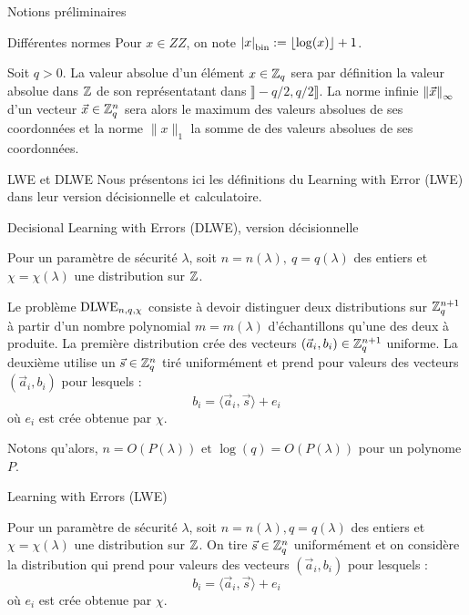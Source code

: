 \begin{section}{Notions préliminaires}
	\begin{subsection}{Différentes normes}
Pour $x\in ZZ$, on note ${|x|}_{\text{bin}} := \lfloor \log(x) \rfloor + 1$.

Soit $q > 0$. La valeur absolue d'un élément $x \in \mathbb{Z}_q$
sera par définition la valeur absolue dans $\mathbb{Z}$ de son représentatant dans
$\rrbracket - q/2, q/2 \rrbracket$. 
	La norme infinie ${\|\vec{x}\|}_{\infty}$ d'un vecteur $\vec{x} \in \mathbb{Z}_q^n$ sera 
alors le maximum des valeurs absolues de ses coordonnées et la norme
$\|x\|_{1}$ la somme de des valeurs absolues de ses coordonnées.

	\end{subsection}
	\begin{subsection}{LWE et DLWE}
	Nous présentons ici les définitions du Learning with Error (LWE) dans leur version décisionnelle et calculatoire.
	
	\begin{definition}{Decisional Learning with Errors (DLWE), version décisionnelle}

	Pour un paramètre de sécurité $\lambda$, soit $n = n(\lambda),\ q = q(\lambda)$ des entiers et $\chi =
	\chi(\lambda)$ une distribution sur $\mathbb{Z}$.
	
	Le problème $\text{DLWE}_{n,q,\chi}$ consiste à devoir distinguer deux distributions sur $\mathbb{Z}_q^{n+1}$ à partir d'un nombre
	polynomial $m = m(\lambda)$ d'échantillons qu'une des deux à produite. La première distribution crée des
	vecteurs $(\vec{a}_i,b_i) \in \mathbb{Z}_q^{n+1}$ uniforme. La deuxième utilise un $\vec{s} \in \mathbb{Z}_q^n$ tiré
	uniformément et prend pour valeurs des vecteurs $(\vec{a}_i, b_i)$ pour lesquels : \[ b_i = \langle \vec{a}_i,
	\vec{s} \rangle + e_i \] où $e_i$ est crée obtenue par $\chi$. \\ \end{definition}
	Notons qu'alors, $n = O(P(\lambda))\text{ et }\log(q) = O(P(\lambda))$ pour un polynome $P$.

	\begin{definition}{Learning with Errors (LWE)}
	
	Pour un paramètre de sécurité $\lambda$, soit $n = n(\lambda),q = q(\lambda)$ des entiers et $\chi =
	\chi(\lambda)$ une distribution sur $\mathbb{Z}$. On tire $\vec{s} \in \mathbb{Z}_q^n$ uniformément et on considère la
	distribution qui prend pour valeurs des vecteurs $(\vec{a}_i, b_i)$ pour lesquels :
	\[ b_i = \langle \vec{a}_i, \vec{s} \rangle + e_i \]
	où $e_i$ est crée obtenue par $\chi$.


\end{definition}
\end{subsection}
\end{section}
